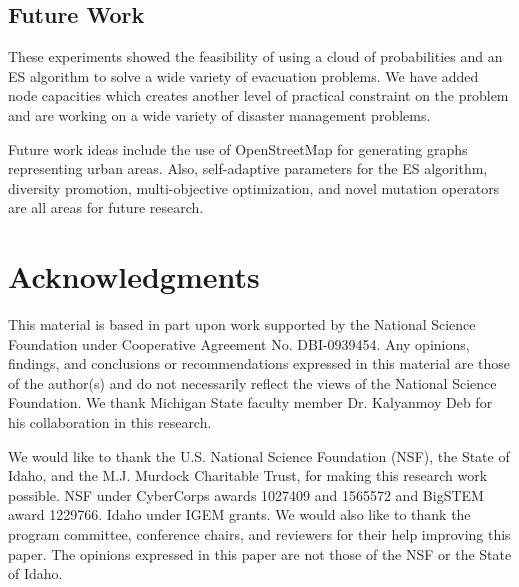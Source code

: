 \documentclass{sig-alternate-05-2015}
\begin{document}
\subsection{Future Work}
These experiments showed the feasibility of
using a cloud of probabilities and an ES algorithm
to solve a wide variety of evacuation problems.
We have added node capacities which creates another
level of practical constraint on the problem and are
working on a wide variety of disaster management
problems.

Future work ideas include the use of OpenStreetMap 
\cite{OpenStreetMap} for generating graphs representing urban areas.
Also, self-adaptive parameters for the ES algorithm, diversity promotion,
multi-objective optimization, and novel mutation operators are all areas
for future research.


\section{Acknowledgments}\label{sec:acknowledgments}
This material is based in part upon work supported by the
National Science Foundation under Cooperative Agreement
No.  DBI-0939454.  Any opinions, findings, and conclusions or
recommendations expressed in this material are those of the
author(s) and do not necessarily reflect the views of the
National Science Foundation.  We thank Michigan State faculty
member Dr. Kalyanmoy Deb for his collaboration in this research.

We would like to thank the U.S. National Science Foundation (NSF), 
the State of Idaho, and the M.J. Murdock Charitable Trust, for making 
this research work possible. NSF under CyberCorps{\regsup} awards 
1027409 and 1565572 and BigSTEM award 1229766. Idaho under IGEM 
grants. We would also like to thank the program committee, conference 
chairs, and reviewers for their help improving this paper. The opinions 
expressed in this paper are not those of the NSF or the State of Idaho.



\end{document}
